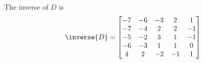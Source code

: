 The inverse of $D$ is
%
\begin{equation*}
\inverse{D}=
\begin{bmatrix}
-7 & -6 & -3 & 2 & 1\\
-7 & -4 & 2 & 2 & -1\\
-5 & -2 & 3 & 1 & -1\\
-6 & -3 & 1 & 1 & 0\\
4 & 2 & -2 & -1 & 1
\end{bmatrix}
\end{equation*}
%

